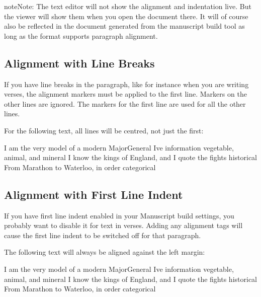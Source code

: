 \documentclass[a4paper,11pt,english]{sphinxmanual}
\begin{document}
\begin{sphinxadmonition}{note}{Note:}
\sphinxAtStartPar
The text editor will not show the alignment and indentation live. But the viewer will show them
when you open the document there. It will of course also be reflected in the document generated
from the manuscript build tool as long as the format supports paragraph alignment.
\end{sphinxadmonition}


\subsection{Alignment with Line Breaks}
\label{\detokenize{usage_format:alignment-with-line-breaks}}
\sphinxAtStartPar
If you have line breaks in the paragraph, like for instance when you are writing verses, the
alignment markers must be applied to the first line. Markers on the other lines are ignored. The
markers for the first line are used for all the other lines.

\sphinxAtStartPar
For the following text, all lines will be centred, not just the first:

\begin{sphinxVerbatim}[commandchars=\\\{\}]
\PYGZgt{}\PYGZgt{} I am the very model of a modern Major\PYGZhy{}General \PYGZlt{}\PYGZlt{}
I\PYGZsq{}ve information vegetable, animal, and mineral
I know the kings of England, and I quote the fights historical
From Marathon to Waterloo, in order categorical
\end{sphinxVerbatim}


\subsection{Alignment with First Line Indent}
\label{\detokenize{usage_format:alignment-with-first-line-indent}}
\sphinxAtStartPar
If you have first line indent enabled in your Manuscript build settings, you probably want to
disable it for text in verses. Adding any alignment tags will cause the first line indent to be
switched off for that paragraph.

\sphinxAtStartPar
The following text will always be aligned against the left margin:

\begin{sphinxVerbatim}[commandchars=\\\{\}]
I am the very model of a modern Major\PYGZhy{}General \PYGZlt{}\PYGZlt{}
I\PYGZsq{}ve information vegetable, animal, and mineral
I know the kings of England, and I quote the fights historical
From Marathon to Waterloo, in order categorical
\end{sphinxVerbatim}
\end{document}
